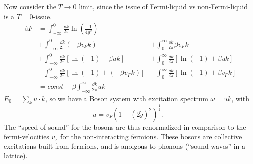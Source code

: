 Now consider the $T\rightarrow 0$ limit, since the issue of Fermi-liquid vs non-Fermi-liquid \underline{is} a $T =0$-issue.
\begin{align*}
-\beta F &= \int_{-\infty}^0\frac{\dd k}{2\pi}\ln\left(\frac{-1}{4g^2}\right)  \\
&+ \int_{-\infty}^0\frac{\dd k}{2\pi}\left(-\beta v_Fk\right) &+ \int_{0}^\infty\frac{\dd k}{2\pi}\beta v_Fk \\
&+ \int_{-\infty}^0\frac{\dd k}{2\pi}\left[\ln(-1) -\beta uk\right]
&+\int_{0}^\infty\frac{\dd k}{2\pi}\left[\ln(-1) +\beta uk\right] \\
&-\int_{-\infty}^0\frac{\dd k}{2\pi}\left[\ln(-1) + (-\beta v_Fk)\right]
&-\int_0^\infty \frac{\dd k}{2\pi}\left[\ln(-1) + \beta v_Fk\right] \\
&= const -\beta\int_{-\infty}^\infty\frac{\dd k}{2\pi}uk 
\end{align*}
\(E_0 = \sum_k u\cdot k\), so we have a Boson system with excitation spectrum \(\omega = uk\), with 
\begin{equation}
u =v_F\left(1-(2\tilde{g})^2\right)^{\frac12}.
\end{equation}
The ``speed of sound'' for the bosons are thus renormalized in comparison to the fermi-velocities \(v_F\) for the non-interacting fermions. These bosons are collective excitations built from fermions, and is anolgous to phonons (``sound waves'' in a lattice).

